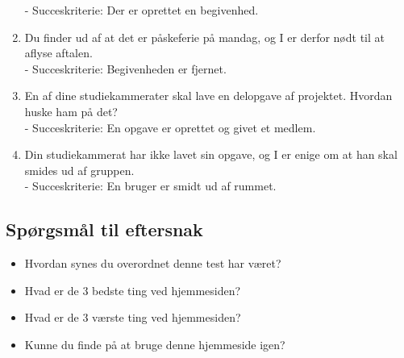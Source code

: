 \documentclass[12pt]{article}
\begin{document}
\begin{enumerate}
- Succeskriterie: Der er oprettet en begivenhed.
\item Du finder ud af at det er påskeferie på mandag, og I er derfor nødt til at aflyse aftalen.\\
- Succeskriterie: Begivenheden er fjernet.
\item En af dine studiekammerater skal lave en delopgave af projektet. Hvordan huske ham på det?\\
- Succeskriterie: En opgave er oprettet og givet et medlem.
\item Din studiekammerat har ikke lavet sin opgave, og I er enige om at han skal smides ud af gruppen.\\
- Succeskriterie: En bruger er smidt ud af rummet.
\end{enumerate}
\subsection{Spørgsmål til eftersnak}
\begin{itemize}
  \item Hvordan synes du overordnet denne test har været?
  \item Hvad er de 3 bedste ting ved hjemmesiden?
  \item Hvad er de 3 værste ting ved hjemmesiden?
  \item Kunne du finde på at bruge denne hjemmeside igen?
\end{itemize}
\end{document}
